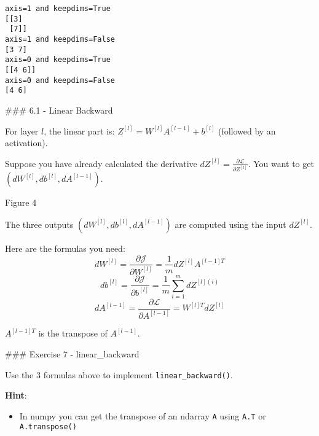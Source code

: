 \documentclass[11pt]{article}
\providecommand{\tightlist}{%
      \setlength{\itemsep}{0pt}\setlength{\parskip}{0pt}}
\begin{document}
    \begin{Verbatim}[commandchars=\\\{\}]
axis=1 and keepdims=True
[[3]
 [7]]
axis=1 and keepdims=False
[3 7]
axis=0 and keepdims=True
[[4 6]]
axis=0 and keepdims=False
[4 6]
    \end{Verbatim}

    \#\#\# 6.1 - Linear Backward

For layer \(l\), the linear part is:
\(Z^{[l]} = W^{[l]} A^{[l-1]} + b^{[l]}\) (followed by an activation).

Suppose you have already calculated the derivative
\(dZ^{[l]} = \frac{\partial \mathcal{L} }{\partial Z^{[l]}}\). You want
to get \((dW^{[l]}, db^{[l]}, dA^{[l-1]})\).

Figure 4

The three outputs \((dW^{[l]}, db^{[l]}, dA^{[l-1]})\) are computed
using the input \(dZ^{[l]}\).

Here are the formulas you need:
\[ dW^{[l]} = \frac{\partial \mathcal{J} }{\partial W^{[l]}} = \frac{1}{m} dZ^{[l]} A^{[l-1] T} \tag{8}\]
\[ db^{[l]} = \frac{\partial \mathcal{J} }{\partial b^{[l]}} = \frac{1}{m} \sum_{i = 1}^{m} dZ^{[l](i)}\tag{9}\]
\[ dA^{[l-1]} = \frac{\partial \mathcal{L} }{\partial A^{[l-1]}} = W^{[l] T} dZ^{[l]} \tag{10}\]

\(A^{[l-1] T}\) is the transpose of \(A^{[l-1]}\).

    \#\#\# Exercise 7 - linear\_backward

Use the 3 formulas above to implement \texttt{linear\_backward()}.

\textbf{Hint}:

\begin{itemize}
\tightlist
\item
  In numpy you can get the transpose of an ndarray \texttt{A} using
  \texttt{A.T} or \texttt{A.transpose()}
\end{itemize}
\end{document}

